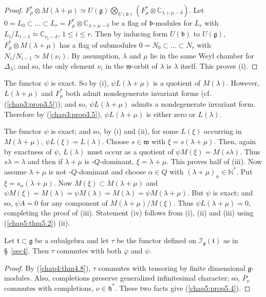 \begin{proof}
$F^*_\mu \otimes M(\lambda + \mu) \simeq U(\mathfrak{g})
  \bigotimes\limits_{U(\mathfrak{b})} (F^*_\mu \otimes
  \mathbb{C}_{\lambda + \mu -\delta})$. Let $0 = L_0 \subset \ldots
  \subset L_r = F^*_\mu \otimes \mathbb{C}_{\lambda + \mu - \delta}$
  be a flag of $\mathfrak{b}$-modules for $L_r$ with $L_i/L_{i-1}
  \simeq \mathbb{C}_{\nu_i - \delta}$, $1 \leq i \leq r$. Then by
  inducing form $U(\mathfrak{b})$ to $U(\mathfrak{g})$, $F^*_\mu
  \otimes M(\lambda + \mu)$ has a flag of submodules  $0= N_0 \subset
  \ldots \subset N_r$ with $N_i/N_{i-1} \simeq M(\nu_i)$. By
  assumption, $\lambda$ and $\mu$ lie in the same Weyl chamber for
  $\Delta_\lambda$; and so, the only element $\nu_i$ in the
  $\mathfrak{w}$-orbit of $\lambda$ is $\lambda$ itself. This proves
  (i).
\end{proof}

The functor $\psi$ is exact. So by (i), $\psi L(\lambda + \mu)$ is a
quotient of $M(\lambda)$. However, $L(\lambda +\mu)$ and $F^*_\mu$
both admit nondegenerate invariant forms (cf. (\ref{chap3:prop3.5})); and so, $\psi
L(\lambda + \mu)$ admits a nondegenerate invariant form. Therefore by
(\ref{chap3:prop3.5}), $\psi L(\lambda + \mu)$ is either zero or $L(\lambda)$.

The functor $\psi$ is exact; and so, by (i) and (ii), for some
$L(\xi)$ occurring in $M(\lambda + \mu)$, $\psi L(\xi ) =
L(\lambda)$. Choose $s \in \mathfrak{w}$ with $\xi = s (\lambda +
\mu)$. Then, again by exactness of $\psi$, $L(\lambda)$ must occur as
a quotient of $\psi M(\xi) = M(s\lambda)$. Thus $s\lambda = \lambda$
and then if $\lambda + \mu$ is -$Q$-dominant, $\xi = \lambda +
\mu$. This proves half of (iii). Now assume $\lambda + \mu$ is not
-$Q$-dominant and choose $\alpha \in Q$ with $(\lambda + \mu)_\alpha
\in \mathbb{N}^*$. Put $\xi = s_\alpha (\lambda + \mu)$. Now $M(\xi)
\subset M(\lambda + \mu)$ and $\psi M(\xi) = M(\lambda) = \psi
M(\lambda) = M(\lambda) = \psi M(\lambda + \mu)$. But $\psi$ is exact;
and so, $\psi A =0$ for any component of $M(\lambda +
\mu)/M(\xi)$. Thus $\psi L(\lambda + \mu) =0$, completing the proof of
(iii). Statement (iv) follows from (i), (ii) and (iii) using (\ref{chap5:thm5.2})
(ii). 

\begin{prop}\label{chap5:prop5.4}
Let $\mathfrak{t} \subset \mathfrak{g}$ be a subalgebra and let $\tau$
be the functor defined on $\mathscr{I}_\mathfrak{g}(\mathfrak{t})$ as
in \S\ \ref{sec4}. Then $\tau$ commutes with both $\varphi$ and $\psi$. 
\end{prop}

\begin{proof} 
By  (\ref{chap4:thm4.8}), $\tau$ commutes with tensoring by finite dimensional
$\mathfrak{g}$-modules. Also, completions preserve generalized
infinitesimal character; so, $P_\nu$ commutes with completions, $\nu
\in \mathfrak{h}^*$. These two facts give (\ref{chap5:prop5.4}).
\end{proof}

